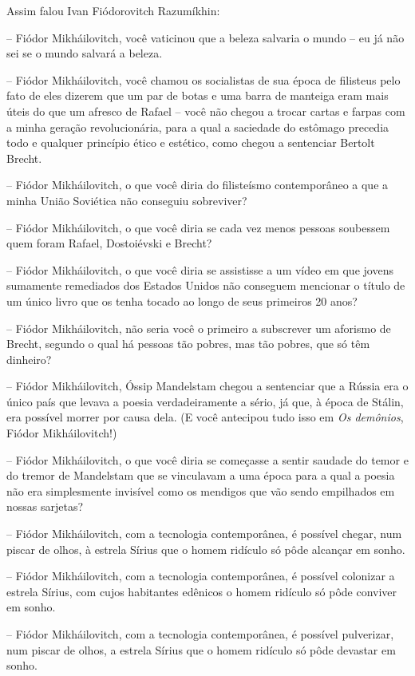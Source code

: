 Assim falou Ivan Fiódorovitch Razumíkhin:

-- Fiódor Mikháilovitch, você vaticinou que a beleza salvaria o mundo --
eu já não sei se o mundo salvará a beleza.

-- Fiódor Mikháilovitch, você chamou os socialistas de sua época de
filisteus pelo fato de eles dizerem que um par de botas e uma barra de
manteiga eram mais úteis do que um afresco de Rafael -- você não chegou
a trocar cartas e farpas com a minha geração revolucionária, para a qual
a saciedade do estômago precedia todo e qualquer princípio ético e
estético, como chegou a sentenciar Bertolt Brecht.

-- Fiódor Mikháilovitch, o que você diria do filisteísmo contemporâneo a
que a minha União Soviética não conseguiu sobreviver?

-- Fiódor Mikháilovitch, o que você diria se cada vez menos pessoas
soubessem quem foram Rafael, Dostoiévski e Brecht?

-- Fiódor Mikháilovitch, o que você diria se assistisse a um vídeo em
que jovens sumamente remediados dos Estados Unidos não conseguem
mencionar o título de um único livro que os tenha tocado ao longo de
seus primeiros 20 anos?

-- Fiódor Mikháilovitch, não seria você o primeiro a subscrever um
aforismo de Brecht, segundo o qual há pessoas tão pobres, mas tão
pobres, que só têm dinheiro?

-- Fiódor Mikháilovitch, Óssip Mandelstam chegou a sentenciar que a
Rússia era o único país que levava a poesia verdadeiramente a sério, já
que, à época de Stálin, era possível morrer por causa dela. (E você
antecipou tudo isso em \emph{Os demônios}, Fiódor Mikháilovitch!)

-- Fiódor Mikháilovitch, o que você diria se começasse a sentir saudade
do temor e do tremor de Mandelstam que se vinculavam a uma época para a
qual a poesia não era simplesmente invisível como os mendigos que vão
sendo empilhados em nossas sarjetas?

-- Fiódor Mikháilovitch, com a tecnologia contemporânea, é possível
chegar, num piscar de olhos, à estrela Sírius que o homem ridículo só
pôde alcançar em sonho.

-- Fiódor Mikháilovitch, com a tecnologia contemporânea, é possível
colonizar a estrela Sírius, com cujos habitantes edênicos o homem
ridículo só pôde conviver em sonho.

-- Fiódor Mikháilovitch, com a tecnologia contemporânea, é possível
pulverizar, num piscar de olhos, a estrela Sírius que o homem ridículo
só pôde devastar em sonho.

